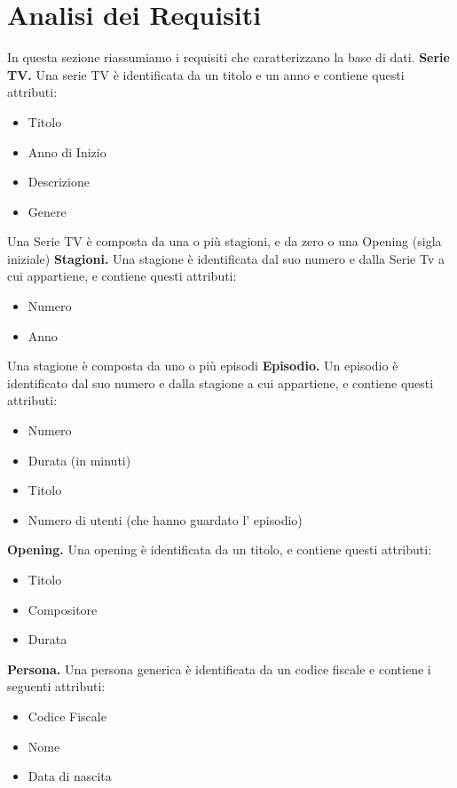 \documentclass[12pt,a4paper]{article}
\begin{document}
\section{Analisi dei Requisiti}
In questa sezione riassumiamo i requisiti che caratterizzano la base di dati.\newline\newline
\textbf{Serie TV.} Una serie TV è identificata da un titolo e un anno e contiene questi attributi:
\begin{itemize}
  \item Titolo
  \item Anno di Inizio
  \item Descrizione
  \item Genere
\end{itemize}
Una Serie TV è composta da una o più stagioni, e da zero o una Opening (sigla iniziale) \newline\newline\newline\newline
\textbf{Stagioni.} Una stagione è identificata dal suo numero e dalla Serie Tv a cui appartiene, e contiene questi attributi:
\begin{itemize}
    \item Numero
    \item Anno
\end{itemize}
Una stagione è composta da uno o più episodi\newline\newline
\textbf{Episodio.} Un episodio è identificato dal suo numero e dalla stagione a cui appartiene, e contiene questi attributi:
\begin{itemize}
    \item Numero
    \item Durata (in minuti)
    \item Titolo
    \item Numero di utenti (che hanno guardato l' episodio)
\end{itemize}
\textbf{Opening.} Una opening è identificata da un titolo, e contiene questi attributi:
\begin{itemize}
    \item Titolo
    \item Compositore
    \item Durata
\end{itemize}
\textbf{Persona.} Una persona generica è identificata da un codice fiscale e contiene i seguenti attributi: 
\begin{itemize}
    \item Codice Fiscale
    \item Nome
    \item Data di nascita
\end{itemize}
\end{document}
